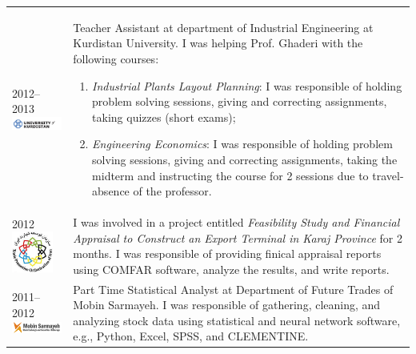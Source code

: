 \documentclass[10PT,letter]{article}
\begin{document}
\begin{tabular}{p{1.2in}p{5.55in}}
						\textsc{2012--2013}\vspace{1mm}\newline \includegraphics[width=2.75cm]{static/logos/UoK} &
												Teacher Assistant at department of Industrial Engineering at Kurdistan University. I was helping Prof. Ghaderi with the following courses:
												\begin{enumerate}
													\item \textit{Industrial Plants Layout Planning}: I was responsible of  holding problem solving sessions, giving and correcting assignments, taking quizzes (short exams);
													\item \textit{Engineering Economics}: I was responsible of holding problem solving sessions, giving and correcting assignments, taking the midterm and instructing the course for 2 sessions due to travel-absence of the professor.
												\end{enumerate}
											 \\[3mm]
						\textsc{2012}\vspace{1mm}\newline \includegraphics[width=1.35cm]{static/logos/TPOI} &
										I was involved in a project entitled \textit{Feasibility Study and Financial Appraisal to Construct an Export Terminal in Karaj Province} for 2 months. 
										I was responsible of providing finical appraisal reports using COMFAR software, analyze the results, and write reports. \\[3mm]
						
						\textsc{2011--2012}\vspace{1mm}\newline \includegraphics[width=2.75cm]{static/logos/Mobien} &
											Part Time Statistical Analyst at Department of Future Trades of Mobin Sarmayeh.
											I was responsible of gathering, cleaning, and analyzing   stock  data using statistical and neural network software, e.g., Python, Excel, SPSS, and CLEMENTINE. \\[3mm]
											

\end{tabular}
\end{document}
